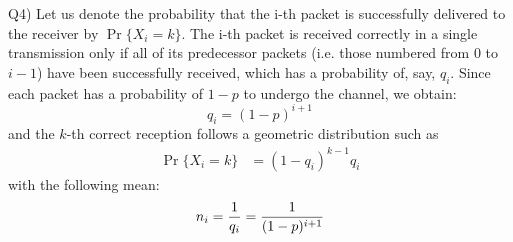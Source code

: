 \documentclass[10pt,letterpaper]{article}
\begin{document}
Q4) Let us denote the probability that the i-th packet is successfully delivered to the receiver by $\Pr\{X_i=k\}$. The i-th packet is received correctly in a single transmission only if all of its predecessor packets (i.e. those numbered from 0 to $i-1$) have been successfully received, which has a probability of, say, $q_i$. Since each packet has a probability of $1-p$ to undergo the channel, we obtain:
$$
q_i=(1-p)^{i+1}
$$
and the $k$-th correct reception follows a geometric distribution such as
\[
\begin{split}
\Pr\{X_i=k\}&=
(1-q_i)^{k-1}q_i
\end{split}
\]
with the following mean:
$$
n_i={1\over q_i}={1\over (1-p)^{i+1}}
$$
\end{document}

